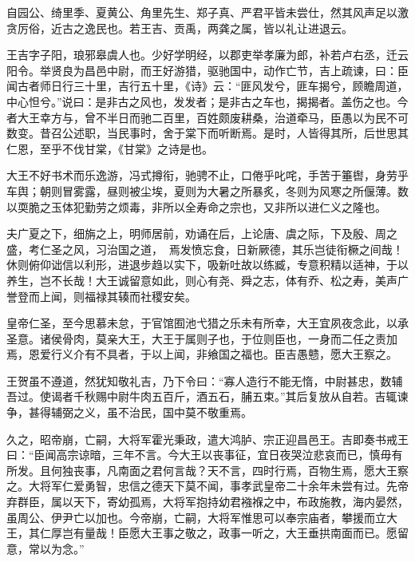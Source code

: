 \documentclass[12pt,UTF8]{ctexbook}
\begin{document}
自园公、绮里季、夏黄公、角里先生、郑子真、严君平皆未尝仕，然其风声足以激贪厉俗，近古之逸民也。若王吉、贡禹，两龚之属，皆以礼让进退云。



王吉字子阳，琅邪皋虞人也。少好学明经，以郡吏举孝廉为郎，补若卢右丞，迁云阳令。举贤良为昌邑中尉，而王好游猎，驱驰国中，动作亡节，吉上疏谏，曰：臣闻古者师日行三十里，吉行五十里，《诗》云：“匪风发兮，匪车揭兮，顾瞻周道，中心怛兮。”说曰：是非古之风也，发发者；是非古之车也，揭揭者。盖伤之也。今者大王幸方与，曾不半日而驰二百里，百姓颇废耕桑，治道牵马，臣愚以为民不可数变。昔召公述职，当民事时，舍于棠下而听断焉。是时，人皆得其所，后世思其仁恩，至乎不伐甘棠，《甘棠》之诗是也。



大王不好书术而乐逸游，冯式撙衔，驰骋不止，口倦乎叱咤，手苦于箠辔，身劳乎车舆；朝则冒雾露，昼则被尘埃，夏则为大暑之所暴炙，冬则为风寒之所偃薄。数以耎脆之玉体犯勤劳之烦毒，非所以全寿命之宗也，又非所以进仁义之隆也。



夫广夏之下，细旃之上，明师居前，劝诵在后，上论唐、虞之际，下及殷、周之盛，考仁圣之风，习治国之道，焉发愤忘食，日新厥德，其乐岂徒衔橛之间哉！休则俯仰诎信以利形，进退步趋以实下，吸新吐故以练臧，专意积精以适神，于以养生，岂不长哉！大王诚留意如此，则心有尧、舜之志，体有乔、松之寿，美声广誉登而上闻，则福禄其辏而社稷安矣。



皇帝仁圣，至今思慕未怠，于官馆囿池弋猎之乐未有所幸，大王宜夙夜念此，以承圣意。诸侯骨肉，莫亲大王，大王于属则子也，于位则臣也，一身而二任之责加焉，恩爱行义介有不具者，于以上闻，非飨国之福也。臣吉愚戆，愿大王察之。



王贺虽不遵道，然犹知敬礼吉，乃下令曰：“寡人造行不能无惰，中尉甚忠，数辅吾过。使谒者千秋赐中尉牛肉五百斤，酒五石，脯五束。”其后复放从自若。吉辄谏争，甚得辅弼之义，虽不治民，国中莫不敬重焉。



久之，昭帝崩，亡嗣，大将军霍光秉政，遣大鸿胪、宗正迎昌邑王。吉即奏书戒王曰：“臣闻高宗谅暗，三年不言。今大王以丧事征，宜日夜哭泣悲哀而已，慎毋有所发。且何独丧事，凡南面之君何言哉？天不言，四时行焉，百物生焉，愿大王察之。大将军仁爱勇智，忠信之德天下莫不闻，事孝武皇帝二十余年未尝有过。先帝弃群臣，属以天下，寄幼孤焉，大将军抱持幼君襁褓之中，布政施教，海内晏然，虽周公、伊尹亡以加也。今帝崩，亡嗣，大将军惟思可以奉宗庙者，攀援而立大王，其仁厚岂有量哉！臣愿大王事之敬之，政事一听之，大王垂拱南面而已。愿留意，常以为念。”
\end{document}
